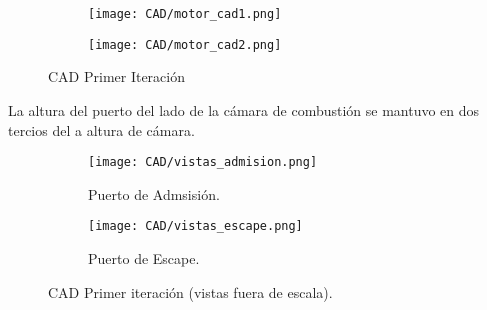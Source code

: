 \begin{figure}
  \centering
    \begin{subfigure}{0.4\textwidth}
        \centering
        \texttt{[image: CAD/motor\_cad1.png]}
    \end{subfigure}
    \hfill
    \begin{subfigure}{0.4\textwidth}
        \centering
        \texttt{[image: CAD/motor\_cad2.png]}
    \end{subfigure}
  \caption{CAD Primer Iteración}\label{fig:motor_cad1}
\end{figure}

La altura del puerto del lado de la cámara de combustión se mantuvo en dos
tercios del a altura de cámara.

\begin{figure}
  \centering
    \begin{subfigure}{0.8\textwidth}
        \centering
        \texttt{[image: CAD/vistas\_admision.png]}
        \caption{Puerto de Admsisión.}
    \end{subfigure}
    \begin{subfigure}{0.8\textwidth}
        \centering
        \texttt{[image: CAD/vistas\_escape.png]}
        \caption{Puerto de Escape.}
    \end{subfigure}
  \caption{CAD Primer iteración (vistas fuera de escala).}\label{fig:motor_cad2}
\end{figure}



